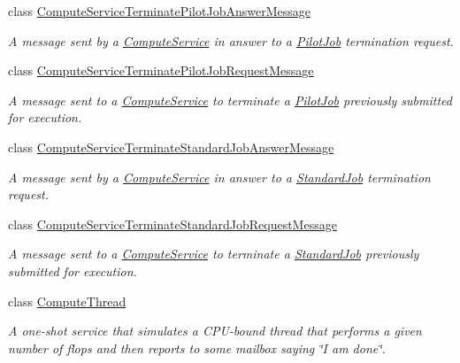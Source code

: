 \begin{DoxyCompactItemize}
class \hyperlink{classwrench_1_1_compute_service_terminate_pilot_job_answer_message}{Compute\+Service\+Terminate\+Pilot\+Job\+Answer\+Message}
\begin{DoxyCompactList}\small\item\em A message sent by a \hyperlink{classwrench_1_1_compute_service}{Compute\+Service} in answer to a \hyperlink{classwrench_1_1_pilot_job}{Pilot\+Job} termination request. \end{DoxyCompactList}\item 
class \hyperlink{classwrench_1_1_compute_service_terminate_pilot_job_request_message}{Compute\+Service\+Terminate\+Pilot\+Job\+Request\+Message}
\begin{DoxyCompactList}\small\item\em A message sent to a \hyperlink{classwrench_1_1_compute_service}{Compute\+Service} to terminate a \hyperlink{classwrench_1_1_pilot_job}{Pilot\+Job} previously submitted for execution. \end{DoxyCompactList}\item 
class \hyperlink{classwrench_1_1_compute_service_terminate_standard_job_answer_message}{Compute\+Service\+Terminate\+Standard\+Job\+Answer\+Message}
\begin{DoxyCompactList}\small\item\em A message sent by a \hyperlink{classwrench_1_1_compute_service}{Compute\+Service} in answer to a \hyperlink{classwrench_1_1_standard_job}{Standard\+Job} termination request. \end{DoxyCompactList}\item 
class \hyperlink{classwrench_1_1_compute_service_terminate_standard_job_request_message}{Compute\+Service\+Terminate\+Standard\+Job\+Request\+Message}
\begin{DoxyCompactList}\small\item\em A message sent to a \hyperlink{classwrench_1_1_compute_service}{Compute\+Service} to terminate a \hyperlink{classwrench_1_1_standard_job}{Standard\+Job} previously submitted for execution. \end{DoxyCompactList}\item 
class \hyperlink{classwrench_1_1_compute_thread}{Compute\+Thread}
\begin{DoxyCompactList}\small\item\em A one-\/shot service that simulates a C\+P\+U-\/bound thread that performs a given number of flops and then reports to some mailbox saying \char`\"{}\+I am done\char`\"{}. \end{DoxyCompactList}\item 

\end{DoxyCompactItemize}
